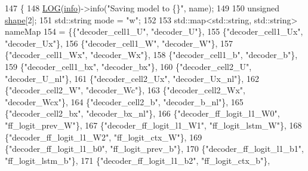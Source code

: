 \begin{DoxyCode}
147                                                                \{
148     \hyperlink{amun_2common_2logging_8h_a8cad147aca8c526d3c8a03ae14d5c87d}{LOG}(\hyperlink{namespacefix__hard_a31eedbb056537bc1bef47ad5e40eaa68}{info})->info(\textcolor{stringliteral}{"Saving model to \{\}"}, name);
149 
150     \textcolor{keywordtype}{unsigned} \hyperlink{namespacemarian_1_1keywords_a5933d683efd12b59e17a7131fa64cf1c}{shape}[2];
151     std::string mode = \textcolor{stringliteral}{"w"};
152 
153     std::map<std::string, std::string> nameMap
154         = \{\{\textcolor{stringliteral}{"decoder\_cell1\_U"}, \textcolor{stringliteral}{"decoder\_U"}\},
155            \{\textcolor{stringliteral}{"decoder\_cell1\_Ux"}, \textcolor{stringliteral}{"decoder\_Ux"}\},
156            \{\textcolor{stringliteral}{"decoder\_cell1\_W"}, \textcolor{stringliteral}{"decoder\_W"}\},
157            \{\textcolor{stringliteral}{"decoder\_cell1\_Wx"}, \textcolor{stringliteral}{"decoder\_Wx"}\},
158            \{\textcolor{stringliteral}{"decoder\_cell1\_b"}, \textcolor{stringliteral}{"decoder\_b"}\},
159            \{\textcolor{stringliteral}{"decoder\_cell1\_bx"}, \textcolor{stringliteral}{"decoder\_bx"}\},
160            \{\textcolor{stringliteral}{"decoder\_cell2\_U"}, \textcolor{stringliteral}{"decoder\_U\_nl"}\},
161            \{\textcolor{stringliteral}{"decoder\_cell2\_Ux"}, \textcolor{stringliteral}{"decoder\_Ux\_nl"}\},
162            \{\textcolor{stringliteral}{"decoder\_cell2\_W"}, \textcolor{stringliteral}{"decoder\_Wc"}\},
163            \{\textcolor{stringliteral}{"decoder\_cell2\_Wx"}, \textcolor{stringliteral}{"decoder\_Wcx"}\},
164            \{\textcolor{stringliteral}{"decoder\_cell2\_b"}, \textcolor{stringliteral}{"decoder\_b\_nl"}\},
165            \{\textcolor{stringliteral}{"decoder\_cell2\_bx"}, \textcolor{stringliteral}{"decoder\_bx\_nl"}\},
166            \{\textcolor{stringliteral}{"decoder\_ff\_logit\_l1\_W0"}, \textcolor{stringliteral}{"ff\_logit\_prev\_W"}\},
167            \{\textcolor{stringliteral}{"decoder\_ff\_logit\_l1\_W1"}, \textcolor{stringliteral}{"ff\_logit\_lstm\_W"}\},
168            \{\textcolor{stringliteral}{"decoder\_ff\_logit\_l1\_W2"}, \textcolor{stringliteral}{"ff\_logit\_ctx\_W"}\},
169            \{\textcolor{stringliteral}{"decoder\_ff\_logit\_l1\_b0"}, \textcolor{stringliteral}{"ff\_logit\_prev\_b"}\},
170            \{\textcolor{stringliteral}{"decoder\_ff\_logit\_l1\_b1"}, \textcolor{stringliteral}{"ff\_logit\_lstm\_b"}\},
171            \{\textcolor{stringliteral}{"decoder\_ff\_logit\_l1\_b2"}, \textcolor{stringliteral}{"ff\_logit\_ctx\_b"}\},

\end{DoxyCode}
